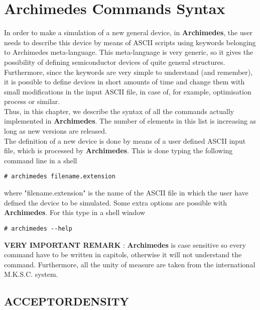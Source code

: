 \documentclass[12pt]{book}
\begin{document}
\chapter{\textbf{Archimedes} Commands Syntax}

In order to make a simulation of a new general device, in \textbf{Archimedes}, the user needs to describe this device by means of ASCII scripts using keywords belonging to Archimedes meta-language. This meta-language is very generic, so it gives the possibility of defining semiconductor devices of quite general structures. Furthermore, since the keywords are very simple to understand (and remember), it is possible to define devices in short amounts of time  and change them with small modifications in the input ASCII file, in case of, for example, optimisation process or similar.
\\
Thus, in this chapter, we describe the syntax of all the commands actually implemented in \textbf{Archimedes}. The number of elements in this list is increasing as long as new versions are released.
\\
The definition of a new device is done by means of a user defined ASCII input file, which is processed by \textbf{Archimedes}. This is done typing the following command line in a shell

\begin{verbatim}
# archimedes filename.extension
\end{verbatim}
where "filename.extension" is the name of the ASCII file in which the user have defined the device to be simulated. Some extra options are possible with \textbf{Archimedes}. For this type in a shell window
\begin{verbatim}
# archimedes --help
\end{verbatim}

\textbf{VERY IMPORTANT REMARK} : \textbf{Archimedes} is case sensitive so every command have to be written in capitols, otherwise it will not understand the command. Furthermore, all the unity of measure are taken from the international M.K.S.C. system.

\section{ACCEPTORDENSITY}
\end{document}
